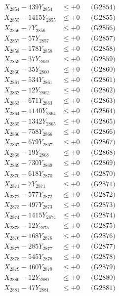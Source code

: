 \documentclass[a4paper,10pt]{article}
\begin{document}
{\begin{align}
X_{2854} - 439Y_{2854} &\leq +0 && \text{(G2854)} \\
X_{2855} - 1415Y_{2855} &\leq +0 && \text{(G2855)} \\
X_{2856} - 7Y_{2856} &\leq +0 && \text{(G2856)} \\
X_{2857} - 57Y_{2857} &\leq +0 && \text{(G2857)} \\
X_{2858} - 178Y_{2858} &\leq +0 && \text{(G2858)} \\
X_{2859} - 37Y_{2859} &\leq +0 && \text{(G2859)} \\
X_{2860} - 35Y_{2860} &\leq +0 && \text{(G2860)} \\
\allowbreak
X_{2861} - 534Y_{2861} &\leq +0 && \text{(G2861)} \\
X_{2862} - 12Y_{2862} &\leq +0 && \text{(G2862)} \\
X_{2863} - 671Y_{2863} &\leq +0 && \text{(G2863)} \\
X_{2864} - 1140Y_{2864} &\leq +0 && \text{(G2864)} \\
X_{2865} - 1342Y_{2865} &\leq +0 && \text{(G2865)} \\
X_{2866} - 758Y_{2866} &\leq +0 && \text{(G2866)} \\
X_{2867} - 679Y_{2867} &\leq +0 && \text{(G2867)} \\
X_{2868} - 19Y_{2868} &\leq +0 && \text{(G2868)} \\
X_{2869} - 730Y_{2869} &\leq +0 && \text{(G2869)} \\
X_{2870} - 618Y_{2870} &\leq +0 && \text{(G2870)} \\
\allowbreak
X_{2871} - 7Y_{2871} &\leq +0 && \text{(G2871)} \\
X_{2872} - 577Y_{2872} &\leq +0 && \text{(G2872)} \\
X_{2873} - 497Y_{2873} &\leq +0 && \text{(G2873)} \\
X_{2874} - 1415Y_{2874} &\leq +0 && \text{(G2874)} \\
X_{2875} - 12Y_{2875} &\leq +0 && \text{(G2875)} \\
X_{2876} - 168Y_{2876} &\leq +0 && \text{(G2876)} \\
X_{2877} - 285Y_{2877} &\leq +0 && \text{(G2877)} \\
X_{2878} - 545Y_{2878} &\leq +0 && \text{(G2878)} \\
X_{2879} - 460Y_{2879} &\leq +0 && \text{(G2879)} \\
X_{2880} - 12Y_{2880} &\leq +0 && \text{(G2880)} \\
\allowbreak
X_{2881} - 47Y_{2881} &\leq +0 && \text{(G2881)} \\

\end{align}}
\end{document}
